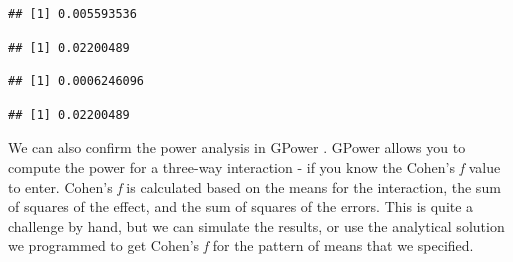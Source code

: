 \documentclass[
]{book}
\newenvironment{Shaded}{\begin{snugshade}}{\end{snugshade}}
\newcommand{\CommentTok}[1]{\textcolor[rgb]{0.56,0.35,0.01}{\textit{#1}}}
\newcommand{\DecValTok}[1]{\textcolor[rgb]{0.00,0.00,0.81}{#1}}
\newcommand{\NormalTok}[1]{#1}
\newcommand{\OperatorTok}[1]{\textcolor[rgb]{0.81,0.36,0.00}{\textbf{#1}}}
\begin{document}
\begin{verbatim}
## [1] 0.005593536
\end{verbatim}

\begin{Shaded}
\end{Shaded}

\begin{verbatim}
## [1] 0.02200489
\end{verbatim}

\begin{Shaded}
\end{Shaded}

\begin{verbatim}
## [1] 0.0006246096
\end{verbatim}

\begin{Shaded}
\end{Shaded}

\begin{verbatim}
## [1] 0.02200489
\end{verbatim}

We can also confirm the power analysis in GPower \citep{faul2007g}. GPower allows you to compute the power for a three-way interaction - if you know the Cohen's \emph{f} value to enter. Cohen's \emph{f} is calculated based on the means for the interaction, the sum of squares of the effect, and the sum of squares of the errors. This is quite a challenge by hand, but we can simulate the results, or use the analytical solution we programmed to get Cohen's \emph{f} for the pattern of means that we specified.

\begin{Shaded}
\end{Shaded}
\end{document}
